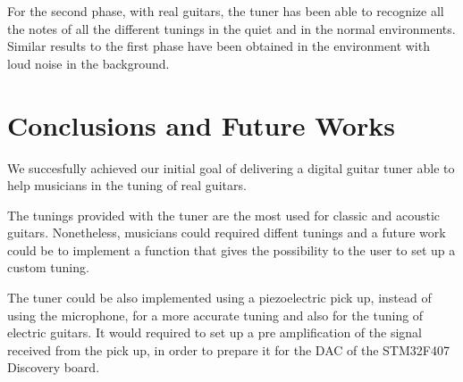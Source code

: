 For the second phase, with real guitars, the tuner has been able to recognize all the notes of all the different tunings in the quiet and in the normal environments. Similar results to the first phase have been obtained in the environment with loud noise in the background.

\section{Conclusions and Future Works}

We succesfully achieved our initial goal of delivering a digital guitar tuner able to help musicians in the tuning of real guitars. 

The tunings provided with the tuner are the most used for classic and acoustic guitars. Nonetheless, musicians could required diffent tunings and a future work could be to implement a function that gives the possibility to the user to set up a custom tuning.

The tuner could be also implemented using a piezoelectric pick up, instead of using the microphone, for a more accurate tuning and also for the tuning of electric guitars. It would required to set up a pre amplification of the signal received from the pick up, in order to prepare it for the DAC of the STM32F407 Discovery board.
 